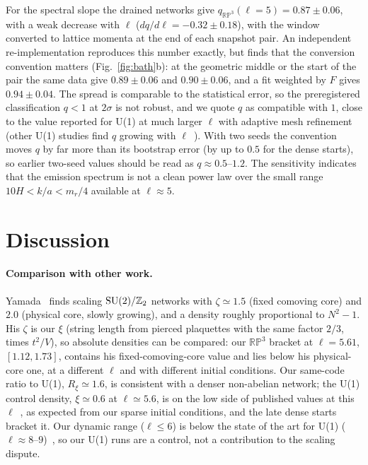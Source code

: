 \documentclass[prd,twocolumn,superscriptaddress,nofootinbib,amsmath,amssymb]{revtex4-2}
\newcommand{\RP}{\mathbb{RP}^3}
\newcommand{\Ztwo}{\mathbb{Z}_2}
\newcommand{\Rxi}{R_\xi}
\begin{document}
For the spectral slope the drained networks give $q_{\RP}(\ell=5)=0.87\pm0.06$, with a weak decrease with $\ell$ ($dq/d\ell=-0.32\pm0.18$), with the window converted to lattice momenta at the end of each snapshot pair.
An independent re-implementation reproduces this number exactly, but finds that the conversion convention matters (Fig.~\ref{fig:bath}b): at the geometric middle or the start of the pair the same data give $0.89\pm0.06$ and $0.90\pm0.06$, and a fit weighted by $F$ gives $0.94\pm0.04$.
The spread is comparable to the statistical error, so the preregistered classification $q<1$ at $2\sigma$ is not robust, and we quote $q$ as compatible with $1$, close to the value reported for U(1) at much larger $\ell$ with adaptive mesh refinement~\cite{Benabou2025} (other U(1) studies find $q$ growing with $\ell$~\cite{GHV2021}).
With two seeds the convention moves $q$ by far more than its bootstrap error (by up to $0.5$ for the dense starts), so earlier two-seed values should be read as $q\approx0.5$--$1.2$.
The sensitivity indicates that the emission spectrum is not a clean power law over the small range $10H<k/a<m_r/4$ available at $\ell\approx5$.

\section{Discussion}

\paragraph{Comparison with other work.}
Yamada~\cite{Yamada2026} finds scaling ${\rm SU}(2)/\Ztwo$ networks with $\zeta\simeq1.5$ (fixed comoving core) and $2.0$ (physical core, slowly growing), and a density roughly proportional to $N^2-1$.
His $\zeta$ is our $\xi$ (string length from pierced plaquettes with the same factor $2/3$, times $t^2/V$), so absolute densities can be compared: our $\RP$ bracket at $\ell=5.61$, $[1.12,1.73]$, contains his fixed-comoving-core value and lies below his physical-core one, at a different $\ell$ and with different initial conditions.
Our same-code ratio to U(1), $\Rxi\simeq1.6$, is consistent with a denser non-abelian network; the U(1) control density, $\xi\simeq0.6$ at $\ell\simeq5.6$, is on the low side of published values at this $\ell$~\cite{GHV2021,Buschmann2022,Hindmarsh2020scaling,Hindmarsh2021approach}, as expected from our sparse initial conditions, and the late dense starts bracket it.
Our dynamic range ($\ell\le6$) is below the state of the art for U(1) ($\ell\approx8$--$9$)~\cite{Correia2024terasite,Correia2025spectrum}, so our U(1) runs are a control, not a contribution to the scaling dispute.
\end{document}
